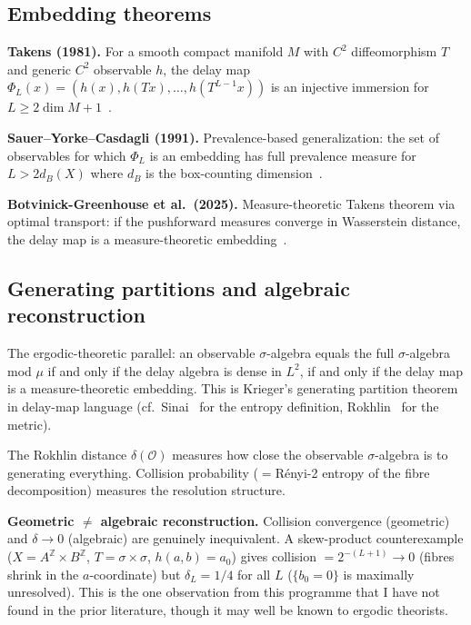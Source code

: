 \subsection{Embedding theorems}

\textbf{Takens (1981).}  For a smooth compact manifold $M$ with
$C^2$ diffeomorphism $T$ and generic $C^2$ observable $h$, the delay
map $\Phi_L(x) = (h(x), h(Tx), \ldots, h(T^{L-1}x))$ is an
injective immersion for
$L \geq 2\dim M + 1$~\cite{Takens1981}.

\textbf{Sauer--Yorke--Casdagli (1991).}  Prevalence-based
generalization: the set of observables for which $\Phi_L$ is an
embedding has full prevalence measure for $L > 2d_B(X)$ where
$d_B$ is the box-counting dimension~\cite{SauerYorkeCasdagli1991}.

\textbf{Botvinick-Greenhouse et al.\ (2025).}  Measure-theoretic
Takens theorem via optimal transport: if the pushforward measures
converge in Wasserstein distance, the delay map is a
measure-theoretic embedding~\cite{BotvinickGreenhouse2025}.

\subsection{Generating partitions and algebraic reconstruction}

The ergodic-theoretic parallel: an observable $\sigma$-algebra
equals the full $\sigma$-algebra mod $\mu$ if and only if the delay
algebra is dense in $L^2$, if and only if the delay map is a
measure-theoretic embedding.  This is Krieger's generating partition
theorem~\cite{Krieger1970} in delay-map language
(cf.~Sinai~\cite{Sinai1959} for the entropy definition,
Rokhlin~\cite{Rokhlin1967} for the metric).

The Rokhlin distance $\delta(\mathcal{O})$ measures how close the
observable $\sigma$-algebra is to generating everything.
Collision probability ($=$R\'{e}nyi-2 entropy of the fibre
decomposition) measures the resolution structure.

\textbf{Geometric $\neq$ algebraic reconstruction.}
Collision convergence (geometric) and $\delta \to 0$ (algebraic)
are genuinely inequivalent.  A skew-product counterexample
($X = A^{\mathbb{Z}} \times B^{\mathbb{Z}}$, $T = \sigma \times
\sigma$, $h(a,b) = a_0$) gives collision $= 2^{-(L+1)} \to 0$
(fibres shrink in the $a$-coordinate) but $\delta_L = 1/4$ for all
$L$ ($\{b_0 = 0\}$ is maximally unresolved).  This is the one
observation from this programme that I have not found in the prior
literature, though it may well be known to ergodic theorists.

